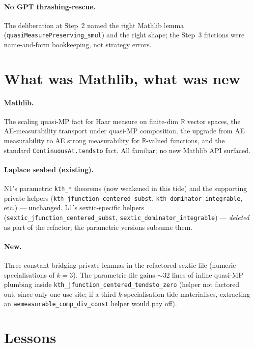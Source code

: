 \documentclass[11pt]{article}
\begin{document}
\paragraph{No GPT thrashing-rescue.} The deliberation at Step~2 named
the right Mathlib lemma (\texttt{quasiMeasurePreserving\_smul}) and
the right shape; the Step~3 frictions were name-and-form bookkeeping,
not strategy errors.

\section{What was Mathlib, what was new}

\paragraph{Mathlib.} The scaling quasi-MP fact for Haar measure on
finite-dim $\mathbb R$ vector spaces, the AE-measurability transport
under quasi-MP composition, the upgrade from AE measurability to AE
strong measurability for $\mathbb R$-valued functions, and the
standard \texttt{ContinuousAt.tendsto} fact. All familiar; no new
Mathlib API surfaced.

\paragraph{Laplace seabed (existing).} N1's parametric \texttt{kth\_*}
theorems (now weakened in this tide) and the supporting private
helpers (\texttt{kth\_jfunction\_centered\_subst},
\texttt{kth\_dominator\_integrable}, etc.) --- unchanged. L1's
sextic-specific helpers
(\texttt{sextic\_jfunction\_centered\_subst},
\texttt{sextic\_dominator\_integrable}) ---
\emph{deleted} as part of the refactor; the parametric versions
subsume them.

\paragraph{New.} Three constant-bridging private lemmas in the
refactored sextic file (numeric specialisations of $k = 3$). The
parametric file gains $\sim$32 lines of inline
quasi-MP plumbing inside
\texttt{kth\_jfunction\_centered\_tendsto\_zero} (helper not factored
out, since only one use site; if a third $k$-specialisation tide
materialises, extracting an
\texttt{aemeasurable\_comp\_div\_const} helper would pay off).

\section{Lessons}
\end{document}
